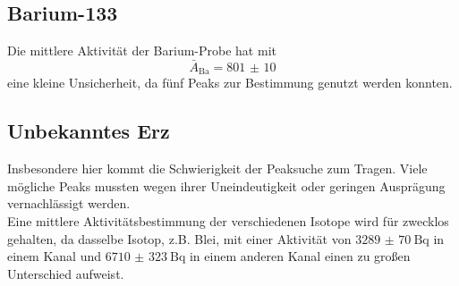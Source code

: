 \subsection{Barium-133}

Die mittlere Aktivität der Barium-Probe hat mit
\begin{equation}
    \bar{A}_\text{Ba} = \num{801(10)}
\end{equation}
eine kleine Unsicherheit, da fünf Peaks zur Bestimmung genutzt werden konnten.\\

\subsection{Unbekanntes Erz}

Insbesondere hier kommt die Schwierigkeit der Peaksuche zum Tragen. Viele mögliche Peaks mussten
wegen ihrer Uneindeutigkeit oder geringen Ausprägung vernachlässigt werden.\\

Eine mittlere Aktivitätsbestimmung der verschiedenen Isotope wird für zwecklos gehalten, da dasselbe Isotop, z.B. Blei, mit 
einer Aktivität von $\qty{3289(70)}{\becquerel}$ in einem Kanal und $\qty{6710(323)}{\becquerel}$ in einem anderen Kanal einen zu großen Unterschied aufweist.\\

